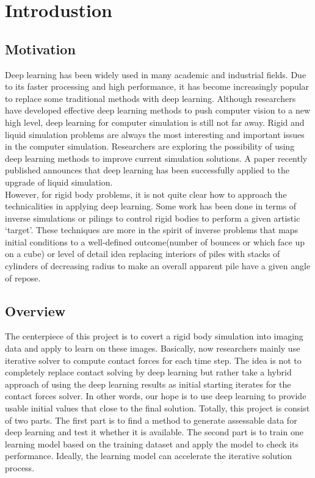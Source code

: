 \chapter{Introdustion}

\section{Motivation}

    Deep learning has been widely used in many academic and industrial fields. Due to its faster processing and high performance, it has become increasingly popular to replace some traditional methods with deep learning. Although researchers have developed effective deep learning methods to push computer vision to a new high level, deep learning for computer simulation is still not far away. Rigid and liquid simulation problems are always the most interesting and important issues in the computer simulation. Researchers are exploring the possibility of using deep learning methods to improve current simulation solutions. A paper recently published announces that deep learning has been successfully applied to the upgrade of liquid simulation\cite{CNNFluid2016}. \\

    However, for rigid body problems, it is not quite clear how to approach the technicalities in applying deep learning. Some work has been done in terms of inverse simulations or pilings to control rigid bodies to perform a given artistic `target'. These techniques are more in the spirit of inverse problems that maps initial conditions to a well-defined outcome(number of bounces or which face up on a cube) or level of detail idea replacing interiors of piles with stacks of cylinders of decreasing radius to make an overall apparent pile have a given angle of repose. \\



\section{Overview}
        The centerpiece of this project is to covert a rigid body simulation into imaging data and apply to learn on these images. Basically, now researchers mainly use iterative solver to compute contact forces for each time step. The idea is not to completely replace contact solving by deep learning but rather take a hybrid approach of using the deep learning results as initial starting iterates for the contact forces solver. In other words, our hope is to use deep learning to provide usable initial values that close to the final solution. Totally, this project is consist of two parts. The first part is to find a method to generate assessable data for deep learning and test it whether it is available. The second part is to train one learning model based on the training dataset and apply the model to check its performance. Ideally, the learning model can accelerate the iterative solution process. \\

